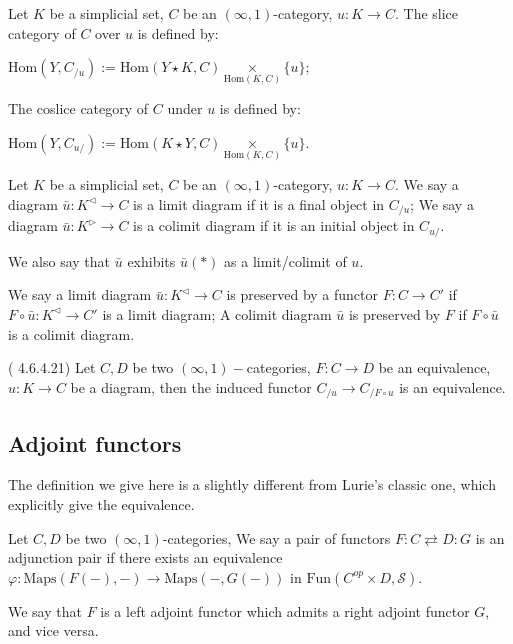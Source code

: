 \begin{definition}
    Let $K$ be a simplicial set, $C$ be an $(\infty,1)$-category, $u: K \to C$. The slice category of $C$ over $u$ is defined by:

    $\text{Hom}(Y,C_{/u}):= \text{Hom}(Y\star K,C)\underset{\text{Hom}(K,C)}{\times}\{u\}$;

    The coslice category of $C$ under $u$ is defined by:

    $\text{Hom}(Y,C_{u/}):= \text{Hom}(K\star Y,C)\underset{\text{Hom}(K,C)}{\times}\{u\}$.
    
\end{definition}




\begin{definition}
    Let $K$ be a simplicial set, $C$ be an $(\infty,1)$-category, $u: K \to C$. We say a diagram $\bar{u}:K^\triangleleft\to C$ is a limit diagram if it is a final object in $C_{/u}$; We say a diagram $\bar{u}:K^\triangleright\to C$ is a colimit diagram if it is an initial object in $C_{u/}$.

    We also say that $\bar{u} $ exhibits $\bar{u}(*)$ as a limit/colimit of $u$.
\end{definition}

\begin{definition}
    We say a limit diagram $\bar{u}:K^\triangleleft\to C$ is preserved by a functor $F:C\to C'$ if $F\circ \bar{u}:K^\triangleleft\to C'$ is a limit diagram; A colimit diagram $\bar{u}$ is preserved by $F$ if $F\circ\bar{u}$ is a colimit diagram.
\end{definition}

\begin{theorem}(\textcite{ker} 4.6.4.21)\label{02GL}
    Let $C,D$ be two $(\infty,1)-$categories, $F:C\to D$ be an equivalence, $u:K\to C$ be a diagram,  then the induced functor $C_{/u}\to C_{/F\circ u}$ is an equivalence.
\end{theorem}



\subsection{Adjoint functors}

The definition we give here is a slightly different from Lurie's classic one, which explicitly give the equivalence.

\begin{definition}
    Let $C,D$ be two $(\infty,1)$-categories, We say a pair of functors $F:C\rightleftarrows D:G$ is an adjunction pair if there exists an equivalence $\varphi:\text{Maps}(F(-),-)\to\text{Maps}(-,G(-))$ in $\text{Fun}(C^{op}\times D,\mathscr{S})$.

    We say that $F$ is a left adjoint functor which admits a right adjoint functor $G$, and vice versa.
\end{definition}

